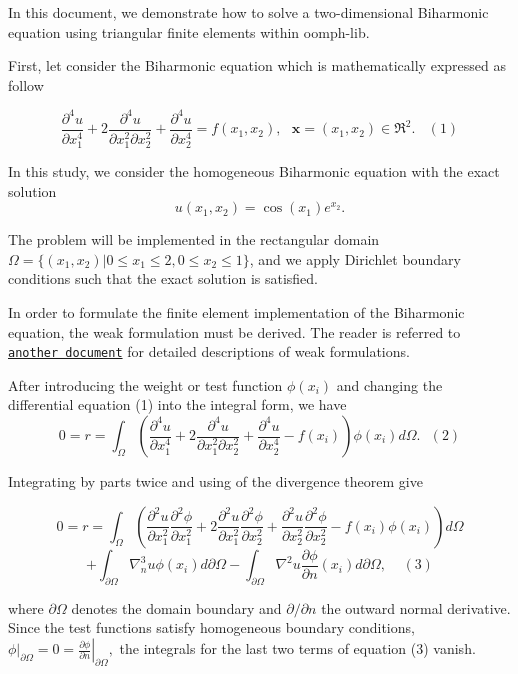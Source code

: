 In this document, we demonstrate how to solve a two-\/dimensional Biharmonic equation using triangular finite elements within {\ttfamily oomph-\/lib}.

First, let consider the Biharmonic equation which is mathematically expressed as follow

\[ \frac{\partial^4 u}{\partial x_1^4} + 2\frac{\partial^4 u}{\partial x_1^2\partial x_2^2} + \frac{\partial^4 u}{\partial x_2^4} = f(x_1,x_2), \ \ \ \mathbf{x} = (x_1,x_2) \in \Re^2. \ \ \ \ (1) \]

In this study, we consider the homogeneous Biharmonic equation with the exact solution \[ u(x_1,x_2) = \cos(x_1)e^{x_2}. \]

The problem will be implemented in the rectangular domain $ \Omega = \{(x_1,x_2) | 0 \leq x_1 \leq 2, 0\leq x_2 \leq 1 \} $, and we apply Dirichlet boundary conditions such that the exact solution is satisfied.

In order to formulate the finite element implementation of the Biharmonic equation, the weak formulation must be derived. The reader is referred to \href{../../../intro/html/index.html}{\tt another document} for detailed descriptions of weak formulations.

After introducing the weight or test function $ \phi(x_i) $ and changing the differential equation (1) into the integral form, we have \[ 0 = r = \int_{\Omega}{\left( \frac{\partial^4 u}{\partial x_1^4} + 2\frac{\partial^4 u}{\partial x_1^2\partial x_2^2} + \frac{\partial^4 u}{\partial x_2^4} - f(x_i)\right) \phi(x_i) d\Omega.} \ \ \ (2) \]

Integrating by parts twice and using of the divergence theorem give

\[ 0 = r = \int_{\Omega}{\left( \frac{\partial^2 u}{\partial x_1^2}\frac{\partial^2 \phi}{\partial x_1^2} + 2\frac{\partial^2 u}{\partial x_1^2}\frac{\partial^2 \phi}{\partial x_2^2} + \frac{\partial^2 u}{\partial x_2^2}\frac{\partial^2 \phi}{\partial x_2^2} - f(x_i)\phi(x_i)\right) d \Omega} \] \[ + \int_{\partial \Omega} \nabla^3_n u \phi(x_i) d\partial \Omega - \int_{\partial \Omega} \nabla^2 u \frac{\partial \phi}{\partial n}(x_i) d\partial \Omega, \ \ \ \ \ (3) \]

where $ \partial \Omega $ denotes the domain boundary and $ \partial/\partial n $ the outward normal derivative. Since the test functions satisfy homogeneous boundary conditions, $ \left. \phi \right|_{\partial \Omega} = 0 = \left. \frac{\partial \phi}{\partial n}\right|_{\partial \Omega}, $ the integrals for the last two terms of equation (3) vanish.

